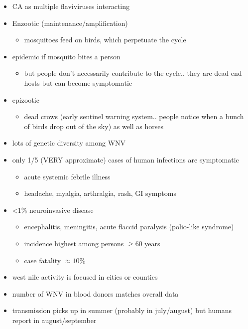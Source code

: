 \documentclass{article}
\begin{document}
    \begin{itemize}
        \item CA as multiple flaviviruses interacting
        \item Enzootic (maintenance/amplification)
        \begin{itemize}
            \item mosquitoes feed on birds, which perpetuate the cycle
        \end{itemize}
        \item epidemic if mosquito bites a person
        \begin{itemize}
            \item but people don't necessarily contribute to the cycle.. they are dead end hosts but can become symptomatic
        \end{itemize}
        \item epizootic
        \begin{itemize}
            \item dead crows (early sentinel warning system.. people notice when a bunch of birds drop out of the sky) as well as horses
        \end{itemize}
        \item lots of genetic diversity among WNV
        \item only 1/5 (VERY approximate) cases of human infections are symptomatic
        \begin{itemize}
            \item acute systemic febrile illness
            \item headache, myalgia, arthralgia, rash, GI symptoms
        \end{itemize}
        \item <1\% neuroinvasive disease
        \begin{itemize}
            \item encephalitis, meningitis, acute flaccid paralysis (polio-like syndrome)
            \item incidence highest among persons $\geq 60$ years
            \item case fatality $\approx 10\%$
        \end{itemize}
        \item west nile activity is focused in cities or counties
        \item number of WNV in blood donors matches overall data
        \item transmission picks up in summer (probably in july/august) but humans report in august/september

\end{itemize}
\end{document}

